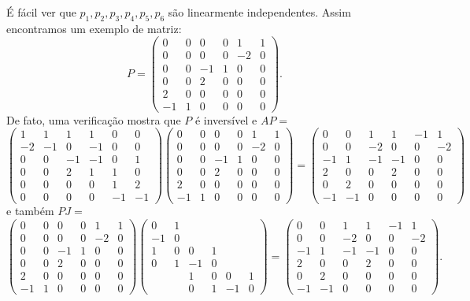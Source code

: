 \documentclass[11pt,a4paper]{article}
\begin{document}
{É fácil ver que $p_1,p_2,p_3,p_4,p_5,p_6$ são linearmente independentes. Assim encontramos um exemplo de matriz:
\[
P=\begin{pmatrix}
0&0&0&0&1&1\\0&0&0&0&-2&0\\0&0&-1&1&0&0\\0&0&2&0&0&0\\2&0&0&0&0&0\\-1&1&0&0&0&0
\end{pmatrix}.
\]
De fato, uma verificação mostra que $P$ é inversível e $AP=$
\[
\begin{pmatrix}
1 & 1 & 1 & 1 & 0 & 0\\
-2 & -1 & 0 & -1 & 0 & 0\\
0 & 0 & -1 & -1 & 0 & 1\\
0 & 0 &  2 & 1 & 1 & 0\\
0 &0 & 0 & 0 & 1 & 2\\
0& 0 & 0 & 0 & -1 & -1
\end{pmatrix}\begin{pmatrix}
0&0&0&0&1&1\\0&0&0&0&-2&0\\0&0&-1&1&0&0\\0&0&2&0&0&0\\2&0&0&0&0&0\\-1&1&0&0&0&0
\end{pmatrix}=\begin{pmatrix}
0&0&1&1&-1&1\\0&0&-2&0&0&-2\\-1&1&-1&-1&0&0\\2&0&0&2&0&0\\0&2&0&0&0&0\\-1&-1&0&0&0&0
\end{pmatrix}
\]
e também $PJ=$
\[
\begin{pmatrix}
0&0&0&0&1&1\\0&0&0&0&-2&0\\0&0&-1&1&0&0\\0&0&2&0&0&0\\2&0&0&0&0&0\\-1&1&0&0&0&0
\end{pmatrix}\begin{pmatrix}
0&1&&&&\\-1&0&&&&\\1&0&0&1&&\\0&1&-1&0&&\\&&1&0&0&1\\&&0&1&-1&0
\end{pmatrix}=\begin{pmatrix}
0&0&1&1&-1&1\\0&0&-2&0&0&-2\\-1&1&-1&-1&0&0\\2&0&0&2&0&0\\0&2&0&0&0&0\\-1&-1&0&0&0&0
\end{pmatrix}.
\]
}
\end{document}
